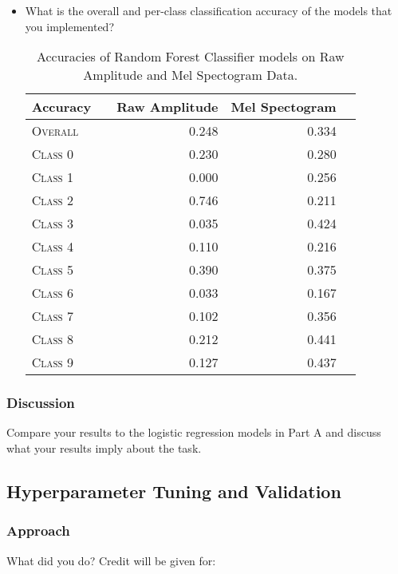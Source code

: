\documentclass[11pt]{article}
\begin{document}
\begin{itemize}
\item  What is the overall and per-class classification accuracy of the models that you implemented?
    \begin{table}[ht]
    \centering
    \begin{tabular}{llrrr}
        \toprule
        Accuracy &  & Raw Amplitude & Mel Spectogram \\
        \midrule
        \textsc{Overall} & & 0.248 & 0.334 \\
        \textsc{Class 0} & & 0.230 & 0.280 \\
        \textsc{Class 1} & & 0.000 & 0.256 \\
        \textsc{Class 2} & & 0.746 & 0.211 \\
        \textsc{Class 3} & & 0.035 & 0.424 \\
        \textsc{Class 4} & & 0.110 & 0.216 \\
        \textsc{Class 5} & & 0.390 & 0.375 \\
        \textsc{Class 6} & & 0.033 & 0.167 \\
        \textsc{Class 7} & & 0.102 & 0.356 \\
        \textsc{Class 8} & & 0.212 & 0.441 \\
        \textsc{Class 9} & & 0.127 & 0.437 \\
        \bottomrule
    \end{tabular}
    \caption{\label{tab:lr_results} Accuracies of Random Forest Classifier models on Raw Amplitude and Mel Spectogram Data.}
    \end{table}
\end{itemize}


\subsubsection{Discussion}
Compare your results to the logistic regression models in Part A and discuss what your results imply about the task.


\subsection{Hyperparameter Tuning and Validation}

\subsubsection{Approach}
What did you do? Credit will be given for:
\end{document}
